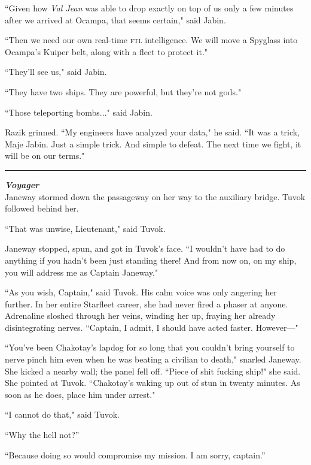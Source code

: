 \documentclass[twoside,letterpaper,12pt]{memoir}
\begin{document}
``Given how \textit{Val Jean} was able to drop exactly on top of us only a few minutes after we arrived at Ocampa, that seems certain," said Jabin.

``Then we need our own real-time \textsc{ftl} intelligence. We will move a Spyglass into Ocampa's Kuiper belt, along with a fleet to protect it."

``They'll see us," said Jabin.

``They have two ships. They are powerful, but they're not gods."

``Those teleporting bombs..." said Jabin.

Razik grinned. ``My engineers have analyzed your data," he said. ``It was a trick, Maje Jabin. Just a simple trick. And simple to defeat. The next time we fight, it will be on our terms."

\begin{center}\rule{3cm}{0.4 pt}\end{center}

\noindent\textit{\textbf{Voyager}}\\

Janeway stormed down the passageway on her way to the auxiliary bridge. Tuvok followed behind her.

``That was unwise, Lieutenant," said Tuvok.

Janeway stopped, spun, and got in Tuvok's face. ``I wouldn't have had to do anything if you hadn't been just standing there! And from now on, on my ship, you will address me as Captain Janeway."

``As you wish, Captain," said Tuvok. His calm voice was only angering her further. In her entire Starfleet career, she had never fired a phaser at anyone. Adrenaline sloshed through her veins, winding her up, fraying her already disintegrating nerves. ``Captain, I admit, I should have acted faster. However---"

``You've been Chakotay's lapdog for so long that you couldn't bring yourself to nerve pinch him even when he was beating a civilian to death," snarled Janeway. She kicked a nearby wall; the panel fell off. ``Piece of shit fucking ship!" she said. She pointed at Tuvok. ``Chakotay's waking up out of stun in twenty minutes. As soon as he does, place him under arrest."

``I cannot do that," said Tuvok.

``Why the hell not?''

``Because doing so would compromise my mission. I am sorry, captain.''
\end{document}
